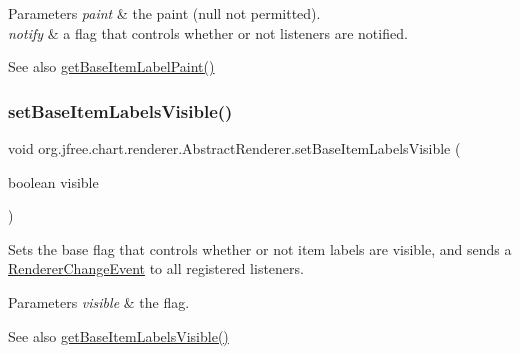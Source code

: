 \begin{DoxyParams}{Parameters}
{\em paint} & the paint ({\ttfamily null} not permitted). \\
\hline
{\em notify} & a flag that controls whether or not listeners are notified.\\
\hline
\end{DoxyParams}
\begin{DoxySeeAlso}{See also}
\mbox{\hyperlink{classorg_1_1jfree_1_1chart_1_1renderer_1_1_abstract_renderer_a553eba1baf9f5d241c06a77c80a223d6}{get\+Base\+Item\+Label\+Paint()}} 
\end{DoxySeeAlso}
\mbox{\label{classorg_1_1jfree_1_1chart_1_1renderer_1_1_abstract_renderer_aef1e2688293f0bdb55b4c4cdaf0fde9c}} 
\subsubsection{\texorpdfstring{set\+Base\+Item\+Labels\+Visible()}{setBaseItemLabelsVisible()}\hspace{0.1cm}{\footnotesize\ttfamily [1/3]}}
{\footnotesize\ttfamily void org.\+jfree.\+chart.\+renderer.\+Abstract\+Renderer.\+set\+Base\+Item\+Labels\+Visible (\begin{DoxyParamCaption}\item[{boolean}]{visible }\end{DoxyParamCaption})}

Sets the base flag that controls whether or not item labels are visible, and sends a \mbox{\hyperlink{}{Renderer\+Change\+Event}} to all registered listeners.


\begin{DoxyParams}{Parameters}
{\em visible} & the flag.\\
\hline
\end{DoxyParams}
\begin{DoxySeeAlso}{See also}
\mbox{\hyperlink{classorg_1_1jfree_1_1chart_1_1renderer_1_1_abstract_renderer_a360a67714905022c4373c33ad83626b8}{get\+Base\+Item\+Labels\+Visible()}} 
\end{DoxySeeAlso}
\mbox{\label{classorg_1_1jfree_1_1chart_1_1renderer_1_1_abstract_renderer_ab9850c8c551535e4f5557853d505ac15}} 
